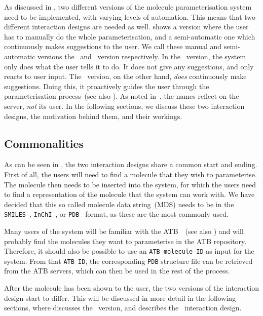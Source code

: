 As discussed in , two different versions of the molecule parameterisation system need to be implemented, with varying levels of automation. This means that two different interaction designs are needed as well.  shows a version where the user has to manually do the whole parameterisation, and a semi-automatic one which continuously makes suggestions to the user. We call these manual and semi-automatic versions the \IDa\ and \IDb\ version respectively. In the \IDa\ version, the system only does what the user tells it to do. It does not give any suggestions, and only reacts to user input. The \IDb\ version, on the other hand, \emph{does} continuously make suggestions. Doing this, it proactively guides the user through the parameterisation process~(see also ). As noted in~, the names reflect on the server, \emph{not} its user. In the following sections, we discuss these two interaction designs, the motivation behind them, and their workings.


\subsection{Commonalities}
As can be seen in , the two interaction designs share a common start and ending. First of all, the users will need to find a molecule that they wish to parameterise. The molecule then needs to be inserted into the system, for which the users need to find a representation of the molecule that the system can work with. We have decided that this so called molecule data string~(MDS) needs to be in the \verb|SMILES|~\cite{daylight1992daylight}, \verb|InChI|~\cite{heller2013inchi}, or \verb|PDB|~\cite{bernstein1977protein} format, as these are the most commonly used.

Many users of the system will be familiar with the ATB~\cite{malde2011automated}~(see also ) and will probably find the molecules they want to parameterise in the ATB repository. Therefore, it should also be possible to use an \verb|ATB molecule ID| as input for the system. From that \verb|ATB ID|, the corresponding \verb|PDB| structure file can be retrieved from the ATB servers, which can then be used in the rest of the process.

After the molecule has been shown to the user, the two versions of the interaction design start to differ. This will be discussed in more detail in the following sections, where  discusses the \IDa\ version, and  describes the \IDb\ interaction design.

